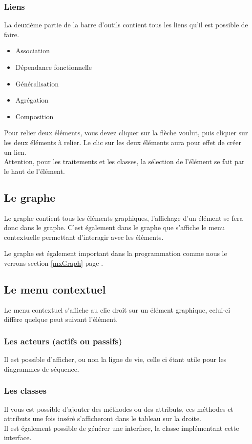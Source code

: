 \documentclass[12pt,a4paper,oneside]{book}
\begin{document}
	\subsubsection{Liens}
	La deuxième partie de la barre d'outils contient tous les liens qu'il est possible de faire.
	\begin{itemize}
		\item Association
		\item Dépendance fonctionnelle
		\item Généralisation
		\item Agrégation
		\item Composition
	\end{itemize}
		Pour relier deux éléments, vous devez cliquer sur la flèche voulut, puis cliquer sur les deux éléments à relier. 
	Le clic sur les deux éléments aura pour effet de créer un lien.\\
	Attention, pour les traitements et les classes, la sélection de l'élément se fait par le haut de l'élément.
	\subsection{Le graphe}
	Le graphe contient tous les éléments graphiques, l'affichage d'un élément se fera donc dans le graphe. 
	C'est également dans le graphe que s'affiche le menu contextuelle permettant d'interagir avec les éléments.

	Le graphe est également important dans la programmation comme nous le verrons section \ref{mxGraph} page \pageref{mxGraph}.

	\subsection{Le menu contextuel}
	Le menu contextuel s'affiche au clic droit sur un élément graphique, celui-ci diffère quelque peut suivant l'élément. 
		\subsubsection{Les acteurs (actifs ou passifs)}
		Il est possible d'afficher, ou non la ligne de vie, celle ci étant utile pour les diagrammes de séquence.
		\subsubsection{Les classes}
		Il vous est possible d'ajouter des méthodes ou des attributs, ces méthodes et attributs une fois inséré s'afficheront dans le tableau sur la droite.\\
		Il est également possible de générer une interface, la classe implémentant cette interface.
\end{document}
